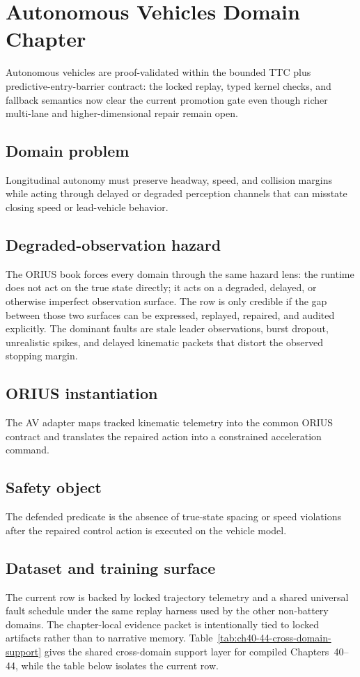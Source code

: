 \chapter{Autonomous Vehicles Domain Chapter}
\label{ch:domain-av}

Autonomous vehicles are proof-validated within the bounded TTC plus predictive-entry-barrier contract: the locked replay, typed kernel checks, and fallback semantics now clear the current promotion gate even though richer multi-lane and higher-dimensional repair remain open.

\section{{Domain problem}}
Longitudinal autonomy must preserve headway, speed, and collision margins while acting through delayed or degraded perception channels that can misstate closing speed or lead-vehicle behavior.

\section{{Degraded-observation hazard}}
The ORIUS book forces every domain through the same hazard lens: the runtime does not act
on the true state directly; it acts on a degraded, delayed, or otherwise imperfect
observation surface.  The row is only credible if the gap between those two surfaces can
be expressed, replayed, repaired, and audited explicitly.
The dominant faults are stale leader observations, burst dropout, unrealistic spikes, and delayed kinematic packets that distort the observed stopping margin.

\section{{ORIUS instantiation}}
The AV adapter maps tracked kinematic telemetry into the common ORIUS contract and translates the repaired action into a constrained acceleration command.

\section{{Safety object}}
The defended predicate is the absence of true-state spacing or speed violations after the repaired control action is executed on the vehicle model.

\section{{Dataset and training surface}}
The current row is backed by locked trajectory telemetry and a shared universal fault schedule under the same replay harness used by the other non-battery domains.
The chapter-local evidence packet is intentionally tied to locked artifacts rather than to
narrative memory.  Table~\ref{tab:ch40-44-cross-domain-support} gives the shared cross-domain
support layer for compiled Chapters~40--44, while the table below isolates the current row.

